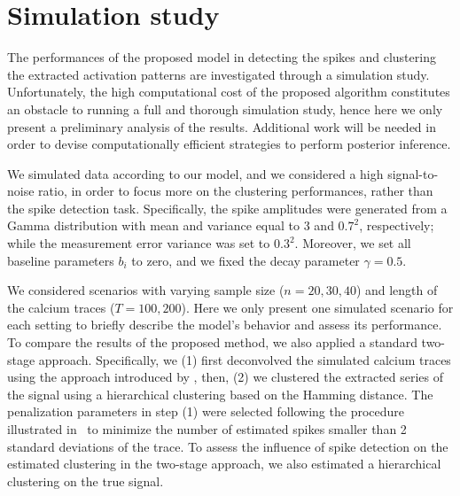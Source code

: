 \section{Simulation study}\label{ch4:sec_sim}
The performances of the proposed model in detecting the spikes and clustering the extracted activation patterns are investigated through a simulation study. Unfortunately, the high computational cost of the proposed algorithm constitutes an obstacle to running a full and thorough simulation study, hence here we only present a preliminary analysis of the results. Additional work will be needed in order to devise computationally efficient strategies to perform posterior inference.

We simulated data according to our model, and we considered a high signal-to-noise ratio, in order to focus more on the clustering performances, rather than the spike detection task. Specifically, the spike amplitudes were generated from a Gamma distribution with mean and variance equal to 3 and $0.7^2$, respectively; while the measurement error variance was set to $0.3^2$. Moreover, we set all baseline parameters $b_i$ to zero, and we fixed the decay parameter $\gamma=0.5$.

We considered scenarios with varying sample size ($n = 20, 30, 40$) and length of the calcium traces ($T = 100, 200$). Here we only present one simulated scenario for each setting to briefly describe the model's behavior and assess its performance. To compare the results of the proposed method, we also applied a standard two-stage approach. Specifically, we (1) first deconvolved the simulated calcium traces using the approach introduced by \textcite{jewell2019}, then, (2) we clustered the extracted series of the signal using a hierarchical clustering based on the Hamming distance. The penalization parameters in step (1) were selected following the procedure illustrated in~\textcite{vries2020} to minimize the number of estimated spikes smaller than 2 standard deviations of the trace. To assess the influence of spike detection on the estimated clustering in the two-stage approach, we also estimated a hierarchical clustering on the true signal. 


